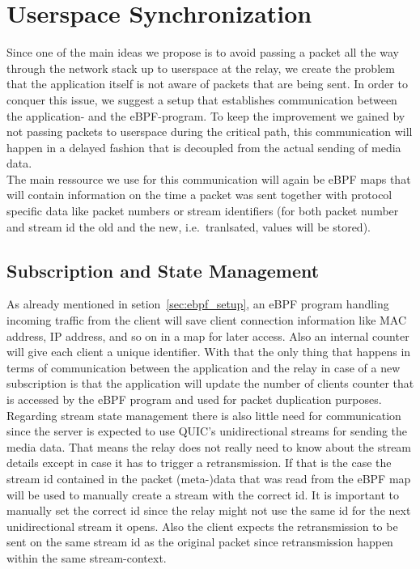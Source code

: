 \section{Userspace Synchronization}\label{sec:userspace_synchronization}

Since one of the main ideas we propose is to avoid passing a packet all the way
through the network stack up to userspace at the relay, we create the problem
that the application itself is not aware of packets that are being sent.
In order to conquer this issue, we suggest a setup that establishes communication
between the application- and the eBPF-program.
To keep the improvement we gained by not passing packets to userspace during the 
critical path, this communication will happen in a delayed fashion that is 
decoupled from the actual sending of media data.
\\
The main ressource we use for this communication will again be eBPF maps that
will contain information on the time a packet was sent together with protocol
specific data like packet numbers or stream identifiers (for both packet number 
and stream id the old and the new, i.e.~tranlsated, values will be stored).



\subsection{Subscription and State Management}
As already mentioned in setion~\ref{sec:ebpf_setup}, an eBPF program handling incoming
traffic from the client will save client connection information like MAC address, IP 
address, and so on in a map for later access.
Also an internal counter will give each client a unique identifier. %
With that the only thing that happens in terms of communication between the application 
and the relay in case of a new subscription is that the application will update the number 
of clients counter that is accessed by the eBPF program and used for packet duplication purposes.
\\
Regarding stream state management there is also little need for communication since the 
server is expected to use QUIC's unidirectional streams for sending the media data. 
That means the relay does not really need to know about the stream details except in case it 
has to trigger a retransmission.
If that is the case the stream id contained in the packet (meta-)data that was read from the eBPF map 
will be used to manually create a stream with the correct id.
It is important to manually set the correct id since the relay might not use the same id for the 
next unidirectional stream it opens.
Also the client expects the retransmission to be sent on the same stream id as the original packet
since retransmission happen within the same stream-context.

